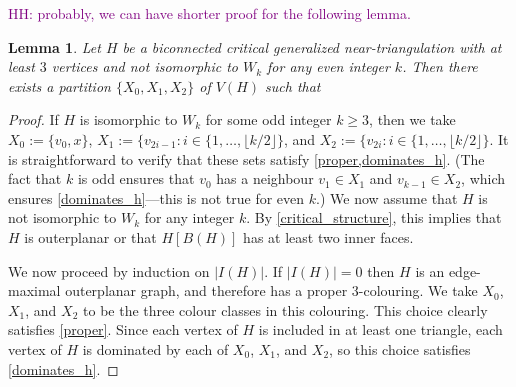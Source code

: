 \documentclass{article}
\newcommand{\hussein}[1]{\textcolor{purple}{HH: #1}}
\newtheorem{lem}{Lemma}
\theoremstyle{definition}
\begin{document}
\hussein{probably, we can have shorter proof for the following lemma.}
\begin{lem}\label{biconnected_critical}
  Let $H$ be a biconnected critical generalized near-triangulation with at least $3$ vertices and not isomorphic to $W_k$ for any even integer $k$.  Then there exists a partition $\{X_0,X_1,X_2\}$ of $V(H)$ such that
\end{lem}

\begin{proof}
  If $H$ is isomorphic to $W_k$ for some odd integer $k\ge 3$, then we take $X_0:=\{v_0, x\}$, $X_1:=\{v_{2i-1}:i\in\{1,\ldots,\lfloor k/2\rfloor\}$, and $X_2:=\{v_{2i}:i\in\{1,\ldots,\lfloor k/2\rfloor\}$.  It is straightforward to verify that these sets satisfy \cref{proper,dominates_h}.  (The fact that $k$ is odd ensures that $v_0$ has a neighbour $v_1\in X_1$ and $v_{k-1}\in X_2$, which ensures \cref{dominates_h}---this is not true for even $k$.)   We now assume that $H$ is not isomorphic to $W_k$ for any integer $k$.  By \cref{critical_structure}, this implies that $H$ is outerplanar or that $H[B(H)]$ has at least two inner faces.

  We now proceed by induction on $|I(H)|$.  If $|I(H)|=0$ then $H$ is an edge-maximal outerplanar graph, and therefore has a proper $3$-colouring.  We take $X_0$, $X_1$, and $X_2$ to be the three colour classes in this colouring.  This choice clearly satisfies \cref{proper}. Since each vertex of $H$ is included in at least one triangle, each vertex of $H$ is dominated by each of $X_0$, $X_1$, and $X_2$, so this choice satisfies \cref{dominates_h}.


\end{proof}
\end{document}
